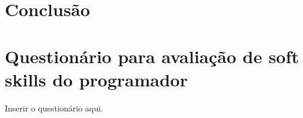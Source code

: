 \documentclass{ppgi}
\begin{document}
\listailustracoes

\listatabelas

\sumario

\elementostextuais




%






\chapter{Conclusão}

\postextual



\apendices

\chapter{Questionário para avaliação de soft skills do programador}
\label{ap:tipi}

Inserir o questionário aqui.
\end{document}
